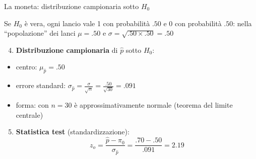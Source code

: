 \documentclass[
  ignorenonframetext,
  compress, aspectratio=149]{beamer}
\providecommand{\tightlist}{%
  \setlength{\itemsep}{0pt}\setlength{\parskip}{0pt}}
\begin{document}
\begin{frame}{La moneta: distribuzione campionaria sotto \(H_0\)}
\label{la-moneta-distribuzione-campionaria-sotto-h_0}
\small

Se \(H_0\) è vera, ogni lancio vale 1 con probabilità \(.50\) e 0 con
probabilità \(.50\): nella ``popolazione'' dei lanci \(\mu = .50\) e
\(\sigma = \sqrt{.50 \times .50} = .50\)

\vspace{2mm}

\begin{enumerate}
\setcounter{enumi}{3}
\tightlist
\item
  \textbf{Distribuzione campionaria} di \(\hat{p}\) sotto \(H_0\):
\end{enumerate}

\begin{itemize}
\tightlist
\item
  centro: \(\mu_{\hat{p}} = .50\)
\item
  errore standard:
  \(\sigma_{\hat{p}} = \frac{\sigma}{\sqrt{n}} = \frac{.50}{\sqrt{30}} = .091\)
\item
  forma: con \(n = 30\) è approssimativamente normale (teorema del
  limite centrale)
\end{itemize}

\vspace{2mm}

\begin{enumerate}
\setcounter{enumi}{4}
\tightlist
\item
  \textbf{Statistica test} (standardizzazione):
  \[z_o = \frac{\hat{p} - \pi_0}{\sigma_{\hat{p}}} = \frac{.70 - .50}{.091} = 2.19\]
\end{enumerate}
\end{frame}
\end{document}
